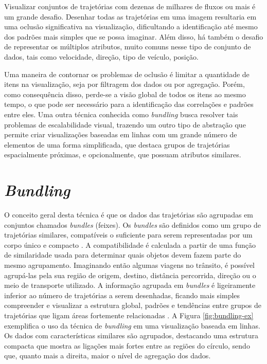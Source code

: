 Visualizar conjuntos de trajetórias com dezenas de milhares de fluxos ou mais é um grande desafio.
Desenhar todas as trajetórias em uma imagem resultaria em uma oclusão significativa na visualização,
dificultando a identificação até mesmo dos padrões mais simples que se possa imaginar. Além disso,
há também o desafio de representar os múltiplos atributos, muito comuns nesse tipo de conjunto de dados,
tais como velocidade, direção, tipo de veículo, posição. 

Uma maneira de contornar os problemas de oclusão é limitar a quantidade de itens
na visualização, seja por filtragem dos dados ou por agregação. Porém, como
consequência disso, perde-se a visão global de todos os itens ao mesmo tempo, o
que pode ser necessário para a identificação das correlações e padrões entre
eles. Uma outra técnica conhecida como \emph{bundling} busca resolver tais
problemas de escalabilidade visual, trazendo um outro tipo de abstração que
permite criar visualizações baseadas em linhas com um grande número de elementos
de uma forma simplificada, que destaca grupos de trajetórias espacialmente
próximas, e opcionalmente, que possuam atributos similares.



\section{\emph{Bundling}}
\label{sec:bundling}

O conceito geral desta técnica é que os dados das trajetórias são agrupadas em
conjuntos chamados \emph{bundles} (feixes). Os \emph{bundles} são definidos como um grupo
de trajetórias similares, compatíveis o suficiente para serem representadas por
um corpo único e compacto \citep{Lhuillier2017}. A compatibilidade é calculada a
partir de uma função de similaridade usada para determinar quais objetos devem
fazem parte do mesmo agrupamento. Imaginando então algumas viagens no trânsito,
é possível agrupá-las pela sua região de origem, destino, distância percorrida,
direção ou o meio de transporte utilizado. A informação agrupada em
\emph{bundles} é ligeiramente inferior ao número de trajetórias a serem
desenhadas, ficando mais simples compreender e visualizar a estrutura global,
padrões e tendências entre grupos de trajetórias que ligam áreas fortemente
relacionadas \citep{Zhou2013}. A Figura \ref{fig:bundling-ex} exemplifica o uso
da técnica de \emph{bundling} em uma visualização baseada em linhas. Os dados
com características similares são agrupados, destacando uma estrutura compacta
que mostra as ligações mais fortes entre as regiões do círculo, sendo que,
quanto mais a direita, maior o nível de agregação dos dados.

